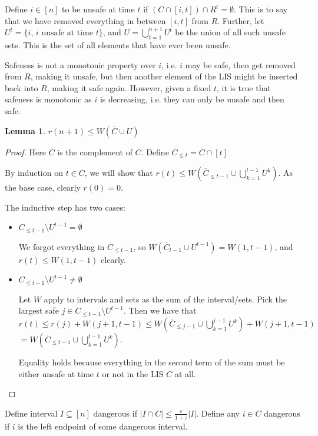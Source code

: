 \documentclass[11pt]{article}
\newcommand{\ve}{\varepsilon}
\newtheorem{lemma}[theorem]{Lemma}
\begin{document}
Define $i \in [n]$ to be unsafe at time $t$ if $(C \cap [i, t]) \cap R^t =
\emptyset$. This is to say that we have removed everything in between $
[i, t]$ from $R$. Further, let $U^t = \{i,\, i \text{ unsafe at time } t\}$, and
$U = \bigcup_{t=1}^{n+1} U^t$ be the union of all such unsafe sets. This is the
set of all elements that have ever been unsafe.

Safeness is not a monotonic property over $i$, i.e. $i$ may be safe, then get
removed from $R$, making it unsafe, but then another element of the LIS might be
inserted back into $R$, making it safe again.
However, given a fixed $t$, it is true that safeness is monotonic as $i$ is
decreasing, i.e. they can only be unsafe and then safe.

\begin{lemma}
$r(n+1) \leq W(\overline{C} \cup U)$
\end{lemma}

\begin{proof}
Here $\overline{C}$ is the complement of $C$. Define $\overline{C}_{\leq t}
= \overline {C} \cap [t]$

By induction on $t \in C$, we will show that
$r(t) \leq W(\overline{C}_{\leq t - 1} \cup \bigcup_{k=1}^{t-1} U^k)$.
As the base case, clearly $r(0) = 0$.

The inductive step has two cases:
\begin{itemize}
\item $C_{\leq t - 1} \setminus U^{t-1} = \emptyset$

We forgot everything in $C_{\leq t - 1}$, so
  $W(\overline{C}_{t-1} \cup U^{t-1}) = W(1, t- 1)$, and
  $r(t) \leq W(1, t - 1)$ clearly.

\item $C_{\leq t - 1} \setminus U^{t-1} \neq \emptyset$

Let $W$ apply to intervals and sets as the sum of the interval/sets.
Pick the largest safe $j \in C_{\leq t - 1} \setminus U^{t-1}$.
Then we have that
  $r(t) \leq r(j) + W(j + 1, t - 1)
  \leq W(\overline{C}_{\leq j - 1} \cup \bigcup_{k=1}^{j-1} U^k) + W(j + 1,
  t - 1)$
  $= W(\overline{C}_{\leq t-1} \cup \bigcup_{k=1}^{t-1} U^k)$.

Equality holds because everything in the second term of the sum must be either
unsafe at time $t$ or not in the LIS $C$ at all.
\end{itemize}
\end{proof}

Define interval $I \subseteq [n]$ dangerous if $|I \cap C| \leq \frac{\ve}{1+\ve} |I|$.
Define any $i \in C$ dangerous if $i$ is the left endpoint of
some dangerous interval.
\end{document}
